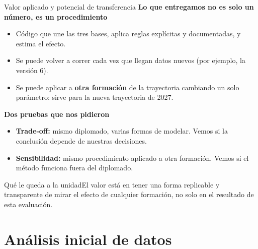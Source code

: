 \documentclass[10pt,aspectratio=169]{beamer}
\newcommand{\sintesis}[2]{%
  \begin{block}{#1}#2\end{block}}
\begin{document}
\begin{frame}{Valor aplicado y potencial de transferencia}
  \textbf{Lo que entregamos no es solo un número, es un procedimiento}
  \begin{itemize}
    \item Código que une las tres bases, aplica reglas explícitas y documentadas, y estima el efecto.
    \item Se puede volver a correr cada vez que llegan datos nuevos (por ejemplo, la versión 6).
    \item Se puede aplicar a \textbf{otra formación} de la trayectoria cambiando un solo parámetro: sirve para la nueva trayectoria de 2027.
  \end{itemize}
  \vspace{0.4em}
  \textbf{Dos pruebas que nos pidieron}
  \begin{itemize}
    \item \textbf{Trade-off:} mismo diplomado, varias formas de modelar. Vemos si la conclusión depende de nuestras decisiones.
    \item \textbf{Sensibilidad:} mismo procedimiento aplicado a otra formación. Vemos si el método funciona fuera del diplomado.
  \end{itemize}
  \vspace{0.3em}
  \sintesis{Qué le queda a la unidad}{El valor está en tener una forma replicable y transparente de mirar el efecto de cualquier formación, no solo en el resultado de esta evaluación.}
\end{frame}

\section{Análisis inicial de datos}
\end{document}
